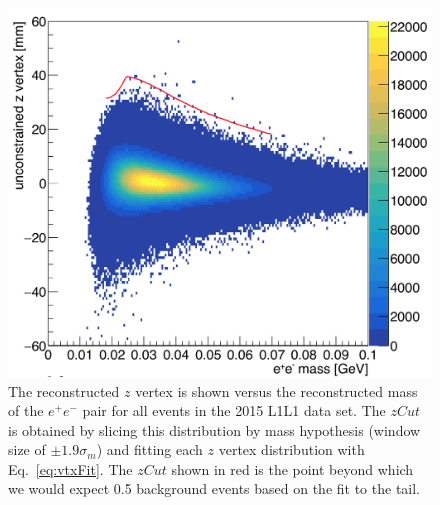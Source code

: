 \documentclass[twocolumn, showpacs, preprintnumbers,prd, superscriptaddress]{revtex4-1}
\begin{document}
        \begin{figure}[th]
            \centering
            \includegraphics[width=.9\linewidth]{figs/zVm_pass8.png}
            \caption{
                The reconstructed $z$ vertex is shown versus the reconstructed mass of the $e^+e^-$ pair for all events in the 2015 L1L1 data set. The $zCut$ is obtained by slicing this distribution by mass hypothesis (window size of $\pm1.9\sigma_{m}$) and fitting each $z$ vertex distribution with Eq.~\eqref{eq:vtxFit}. The $zCut$ shown in red is the point beyond which we would expect 0.5 background events based on the fit to the tail.}
            \label{fig:zvtx}
        \end{figure}
\end{document}

